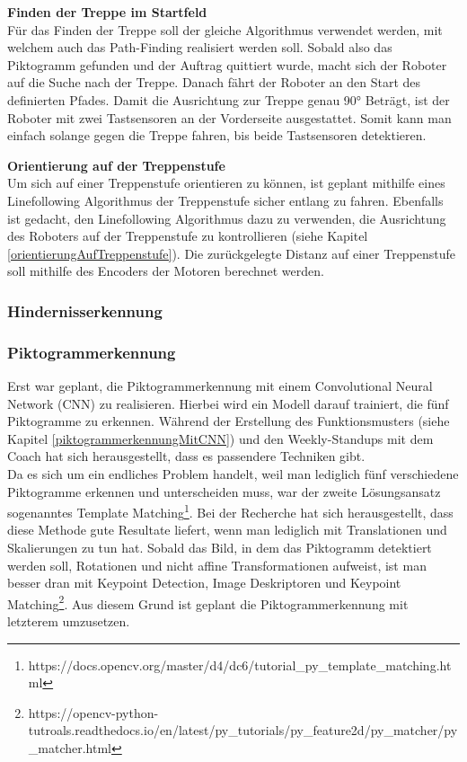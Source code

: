 \textbf{Finden der Treppe im Startfeld}\\
Für das Finden der Treppe soll der gleiche Algorithmus verwendet werden, mit welchem auch das Path-Finding realisiert werden soll. Sobald also das Piktogramm gefunden und der Auftrag quittiert wurde, macht sich der Roboter auf die Suche nach der Treppe. Danach fährt der Roboter an den Start des definierten Pfades. Damit die Ausrichtung zur Treppe genau 90° Beträgt, ist der Roboter mit zwei Tastsensoren an der Vorderseite ausgestattet. Somit kann man einfach solange gegen die Treppe fahren, bis beide Tastsensoren detektieren.

\textbf{Orientierung auf der Treppenstufe}\\
Um sich auf einer Treppenstufe orientieren zu können, ist geplant mithilfe eines Linefollowing Algorithmus der Treppenstufe sicher entlang zu fahren. Ebenfalls ist gedacht, den Linefollowing Algorithmus dazu zu verwenden, die Ausrichtung des Roboters auf der Treppenstufe zu kontrollieren (siehe Kapitel \ref{orientierungAufTreppenstufe}).
Die zurückgelegte Distanz auf einer Treppenstufe soll mithilfe des Encoders der Motoren berechnet werden.

\subsubsection{Hindernisserkennung}

\subsubsection{Piktogrammerkennung}
Erst war geplant, die Piktogrammerkennung mit einem Convolutional Neural Network (CNN) zu realisieren. Hierbei wird ein Modell darauf trainiert, die fünf Piktogramme zu erkennen. Während der Erstellung des Funktionsmusters (siehe Kapitel \ref{piktogrammerkennungMitCNN}) und den Weekly-Standups mit dem Coach hat sich herausgestellt, dass es passendere Techniken gibt.\\
Da es sich um ein endliches Problem handelt, weil man lediglich fünf verschiedene Piktogramme erkennen und unterscheiden muss, war der zweite Lösungsansatz sogenanntes Template Matching\footnote{https://docs.opencv.org/master/d4/dc6/tutorial\_py\_template\_matching.html}. Bei der Recherche hat sich herausgestellt, dass diese Methode gute Resultate liefert, wenn man lediglich mit Translationen und Skalierungen zu tun hat. Sobald das Bild, in dem das Piktogramm detektiert werden soll, Rotationen und nicht affine Transformationen aufweist, ist man besser dran mit Keypoint Detection, Image Deskriptoren und Keypoint Matching\footnote{https://opencv-python-tutroals.readthedocs.io/en/latest/py\_tutorials/py\_feature2d/py\_matcher/py\_matcher.html}. Aus diesem Grund ist geplant die Piktogrammerkennung mit letzterem umzusetzen.




